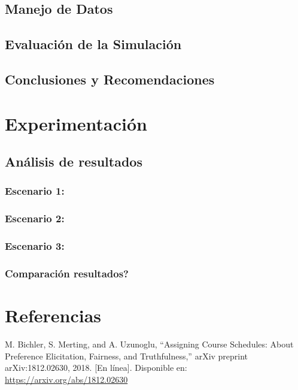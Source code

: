 \documentclass{article}
\begin{document}
\subsection{Manejo de Datos}

\subsection{Evaluación de la Simulación}


\subsection{Conclusiones y Recomendaciones}



\section{Experimentación}\label{sec:exp}

\subsection{Análisis de resultados}

\subsubsection{Escenario 1: }

\subsubsection{Escenario 2: }
 
\subsubsection{Escenario 3: }

\subsubsection{Comparación resultados?}



\section{Referencias}
\renewcommand{\refname}{}

\begin{thebibliography}{9}

 \label{ref:BPS} M. Bichler, S. Merting, and A. Uzunoglu, 
“Assigning Course Schedules: About Preference Elicitation, Fairness, and Truthfulness,” 
arXiv preprint arXiv:1812.02630, 2018. [En línea]. Disponible en: 
\url{https://arxiv.org/abs/1812.02630}


\end{thebibliography}
\end{document}
